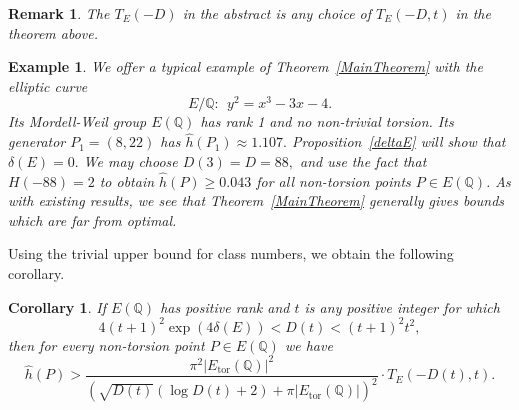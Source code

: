 \documentclass[12pt]{amsart}
\newtheorem*{remark}{Remark}
\newtheorem*{example}{Example}
\newtheorem{corollary}[theorem]{Corollary}
\newcommand{\Z}{\mathbb{Z}}
\newcommand{\Q}{\mathbb{Q}}
\newcommand{\tor}{\mathrm{tor}}
\numberwithin{equation}{section}
\begin{document}
\begin{remark}
The $T_E(-D)$ in the abstract is any choice of $T_E(-D,t)$ in the theorem above.
\end{remark}


\begin{example} We offer a typical example of Theorem~\ref{MainTheorem} with the elliptic curve
$$
E/\Q: \ \ y^2= x^3 -3x-4.
$$
Its Mordell-Weil group $E(\Q)$ has rank 1 and no non-trivial torsion. Its generator
$P_1=\left(8,22\right)$ has 
$\widehat{h}(P_1)\approx 1.107.$
 Proposition~\ref{deltaE} will show that $\delta(E)=0.$  We may choose $D(3)=D=88,$ and use the fact that $H(-88)=2$ to obtain $\widehat{h}(P)\geq 0.043$ for all non-torsion points $P\in E(\Q)$.
 As with existing results,  we see that Theorem~\ref{MainTheorem} generally gives
 bounds which are far from optimal. 
\end{example}

Using the trivial upper bound for class numbers, we obtain the following corollary.

 
 \begin{corollary}\label{MainCorollary} 
 If $E(\Q)$ has positive rank
 and $t$ is any positive integer for which 
 $$
 4(t+1)^2\exp(4\delta(E))< D(t)<(t+1)^2t^2,
 $$
   then for every non-torsion point $P\in E(\Q)$ we have
$$
\widehat{h}(P) >  
\frac{\pi^2|E_\tor(\Q)|^2}{(\sqrt{D(t)}(\log D(t)+2)+\pi|E_\tor(\Q)|)^2} \cdot T_E(-D(t),t).
$$
\end{corollary} 





\end{document}

